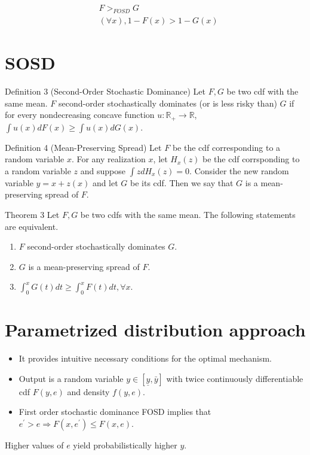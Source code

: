 \documentclass[10pt]{article}
\begin{document}
$$
\begin{aligned}
& F>_{F O S D} G \\
& (\forall x), 1-F(x)>1-G(x)
\end{aligned}
$$

\section*{SOSD}
Definition 3 (Second-Order Stochastic Dominance) Let $F, G$ be two cdf with the same mean. $F$ second-order stochastically dominates (or is less risky than) $G$ if for every nondecreasing concave function $u: \mathbb{R}_{+} \rightarrow \mathbb{R}$, $\int u(x) d F(x) \geq \int u(x) d G(x)$.

Definition 4 (Mean-Preserving Spread) Let $F$ be the cdf corresponding to a random variable $x$. For any realization $x$, let $H_{x}(z)$ be the cdf corrsponding to a random variable $z$ and suppose $\int z d H_{x}(z)=0$. Consider the new random variable $y=x+z(x)$ and let $G$ be its cdf. Then we say that $G$ is a mean-preserving spread of $F$.

Theorem 3 Let $F, G$ be two cdfs with the same mean. The following statements are equivalent.

\begin{enumerate}
  \item $F$ second-order stochastically dominates $G$.
  \item $G$ is a mean-preserving spread of $F$.
  \item $\int_{0}^{x} G(t) d t \geq \int_{0}^{x} F(t) d t, \forall x$.
\end{enumerate}

\section*{Parametrized distribution approach}
\begin{itemize}
  \item It provides intuitive necessary conditions for the optimal mechanism.
  \item Output is a random variable $y \in[\underline{y}, \bar{y}]$ with twice continuously differentiable cdf $F(y, e)$ and density $f(y, e)$.
  \item First order stochastic dominance FOSD implies that $e^{\prime}>e \Longrightarrow F\left(x, e^{\prime}\right) \leq F(x, e)$.
\end{itemize}

Higher values of $e$ yield probabilistically higher $y$.
\end{document}

